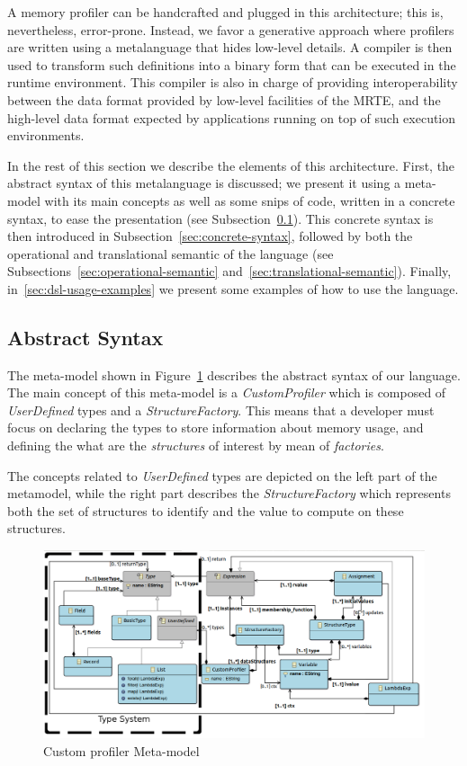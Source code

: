 A memory profiler can be handcrafted and plugged in this architecture; this is, nevertheless, error-prone.
Instead, we favor a generative approach where profilers are written using a metalanguage that hides low-level details.
A compiler is then used to transform such definitions into a binary form that can be executed in the runtime environment.
This compiler is also in charge of providing interoperability between the data format provided by low-level facilities of the MRTE, and the high-level data format expected by applications running on top of such execution environments. 

In the rest of this section we describe the elements of this architecture.
First, the abstract syntax of this metalanguage is discussed; we present it using a meta-model with its main concepts as well as some snips of code, written in a concrete syntax, to ease the presentation (see Subsection~\ref{sec:abstract-syntax}).
This concrete syntax is then introduced in Subsection~\ref{sec:concrete-syntax}, followed by both the operational and translational semantic of the language (see Subsections~\ref{sec:operational-semantic} and~\ref{sec:translational-semantic}).
Finally, in~\ref{sec:dsl-usage-examples} we present some examples of how to use the language.


\subsection{Abstract Syntax}\label{sec:abstract-syntax}

The meta-model shown in Figure~\ref{fig:as} describes the abstract syntax of our language.
The main concept of this meta-model is a \textit{CustomProfiler} which is composed of \textit{UserDefined} types and a \textit{StructureFactory}.
This means that a developer must focus on declaring the types to store information about memory usage, and defining the what are the \textit{structures} of interest by mean of \textit{factories}.

The concepts related to \textit{UserDefined} types are depicted on the left part of the metamodel, while the right part describes the \textit{StructureFactory} which represents both the set of  structures to identify and the value to compute on these structures.

\begin{figure}
\centering
\includegraphics[width=0.93\linewidth]{chapter6/fig/AS}
\caption{Custom profiler Meta-model}
\label{fig:as}
\end{figure}

